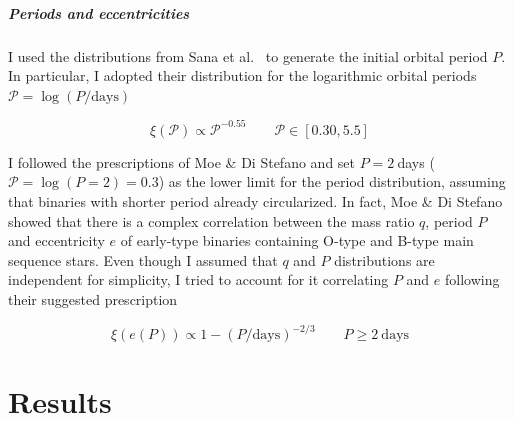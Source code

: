 \documentclass[a4paper,titlepage]{book}     	%
\newcommand{\sun}{\ensuremath{_\odot}}
\newcommand{\msun}{\ensuremath{M\sun}}
\begin{document}

\paragraph{Periods and eccentricities} I used the  distributions from Sana et al.\ \cite{Sana2012} to  generate the initial orbital period $P$. In particular, I adopted their distribution for the logarithmic orbital periods $\mathcal{P} = \log(P/\text{days})$

\begin{equation}
	\xi(\mathcal{P}) \propto \mathcal{P}^{-0.55} \qquad \mathcal{P} \in [0.30,5.5]
\end{equation}

I followed the prescriptions of Moe \& Di Stefano \cite{MoeDiStefano2017} and set $P=2~$days ($\mathcal{P}=\log(P=2)=0.3$) as the lower limit for the period distribution, assuming that binaries with shorter period already circularized. In fact, Moe \& Di Stefano showed that there is a complex correlation between the mass ratio $q$, period $P$ and eccentricity $e$ of early-type binaries containing O-type and B-type main sequence stars. Even though I assumed that $q$ and $P$ distributions are independent for simplicity, I tried to account for it correlating $P$ and $e$ following their suggested prescription

\begin{equation}
	\xi (e (P)) \propto 1-(P/\text{days})^{-2/3} \qquad P \geq 2~\text{days}
\end{equation}







\chapter{Results}\label{sec:results}
\end{document}

